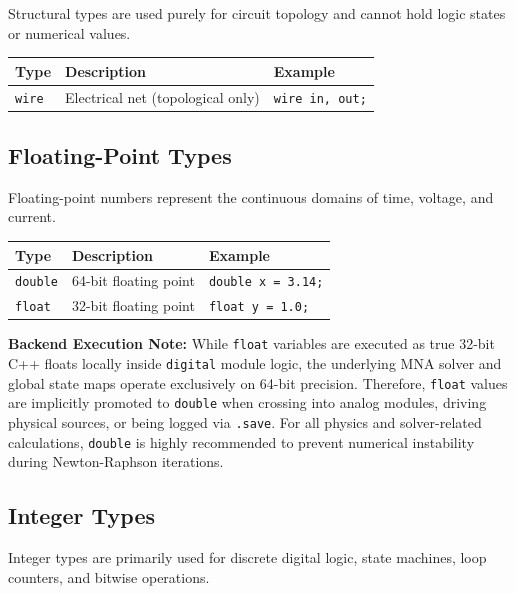 \documentclass[11pt, a4paper]{article}
\newcommand{\code}[1]{\texttt{\small #1}}
\begin{document}
Structural types are used purely for circuit topology and cannot hold logic states or numerical values.

\begin{center}
\begin{tabular}{@{} L{3.2cm} L{5.5cm} L{4cm} @{}}
  \toprule
  \textbf{Type} & \textbf{Description} & \textbf{Example} \\
  \midrule
  \code{wire}         & Electrical net (topological only) & \code{wire in, out;} \\
  \bottomrule
\end{tabular}
\end{center}

\subsection{Floating-Point Types}
Floating-point numbers represent the continuous domains of time, voltage, and current.

\begin{center}
\begin{tabular}{@{} L{3.2cm} L{5.5cm} L{4cm} @{}}
  \toprule
  \textbf{Type} & \textbf{Description} & \textbf{Example} \\
  \midrule
  \code{double}       & 64-bit floating point             & \code{double x = 3.14;} \\
  \code{float}        & 32-bit floating point             & \code{float y = 1.0;} \\
  \bottomrule
\end{tabular}
\end{center}

\textbf{Backend Execution Note:} 
While \code{float} variables are executed as true 32-bit C++ floats locally inside \code{digital} module logic, the underlying MNA solver and global state maps operate exclusively on 64-bit precision. Therefore, \code{float} values are implicitly promoted to \code{double} when crossing into analog modules, driving physical sources, or being logged via \code{.save}. For all physics and solver-related calculations, \code{double} is highly recommended to prevent numerical instability during Newton-Raphson iterations.

\subsection{Integer Types}
Integer types are primarily used for discrete digital logic, state machines, loop counters, and bitwise operations.
\end{document}
